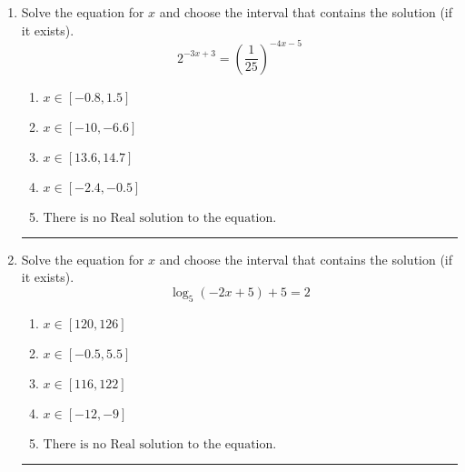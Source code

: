 \documentclass[14pt]{extbook}
\newcommand{\litem}[1]{\item#1\hspace*{-1cm}\rule{\textwidth}{0.4pt}}
\begin{document}
\begin{enumerate}
{\begin{enumerate}[label=\Alph*.]
\end{enumerate} }
\litem{
Solve the equation for $x$ and choose the interval that contains the solution (if it exists).\[ 2^{-3x+3} = \left(\frac{1}{25}\right)^{-4x-5} \]\begin{enumerate}[label=\Alph*.]
\item \( x \in [-0.8, 1.5] \)
\item \( x \in [-10, -6.6] \)
\item \( x \in [13.6, 14.7] \)
\item \( x \in [-2.4, -0.5] \)
\item \( \text{There is no Real solution to the equation.} \)

\end{enumerate} }
\litem{
Solve the equation for $x$ and choose the interval that contains the solution (if it exists).\[ \log_{5}{(-2x+5)}+5 = 2 \]\begin{enumerate}[label=\Alph*.]
\item \( x \in [120, 126] \)
\item \( x \in [-0.5, 5.5] \)
\item \( x \in [116, 122] \)
\item \( x \in [-12, -9] \)
\item \( \text{There is no Real solution to the equation.} \)

\end{enumerate} }
\end{enumerate}
\end{document}
